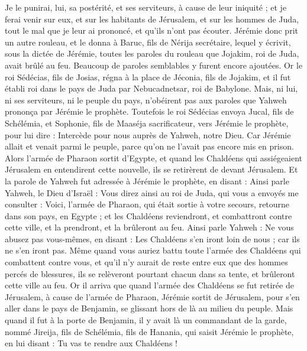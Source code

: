 \begin{multicols}{2}
Je le punirai, lui, sa postérité, et ses serviteurs, à cause de leur iniquité ; et je ferai venir sur eux, et sur les habitants de Jérusalem, et sur les hommes de Juda, tout le mal que je leur ai prononcé, et qu'ils n'ont pas écouter.
Jérémie donc prit un autre rouleau, et le donna à Baruc, fils de Nérija secrétaire, lequel y écrivit, sous la dictée de Jérémie, toutes les paroles du rouleau que Jojakim, roi de Juda, avait brûlé au feu. Beaucoup de paroles semblables y furent encore ajoutées.
\VerseOne{}Or le roi Sédécias, fils de Josias, régna à la place de Jéconia, fils de Jojakim, et il fut établi roi dans le pays de Juda par Nebucadnetsar, roi de Babylone.
Mais, ni lui, ni ses serviteurs, ni le peuple du pays, n'obéirent pas aux paroles que Yahweh prononça par Jérémie le prophète.
Toutefois le roi Sédécias envoya Jucal, fils de Schélémia, et Sophonie, fils de Maaséja sacrificateur, vers Jérémie le prophète, pour lui dire : Intercède pour nous auprès de Yahweh, notre Dieu.
Car Jérémie allait et venait parmi le peuple, parce qu'on ne l'avait pas encore mis en prison.
Alors l'armée de Pharaon sortit d'Egypte, et quand les Chaldéens qui assiégeaient Jérusalem en entendirent cette nouvelle, ils se retirèrent de devant Jérusalem.
Et la parole de Yahweh fut adressée à Jérémie le prophète, en disant :
Ainsi parle Yahweh, le Dieu d'Israël : Vous direz ainsi au roi de Juda, qui vous a envoyés me consulter : Voici, l'armée de Pharaon, qui était sortie à votre secours, retourne dans son pays, en Egypte ;
et les Chaldéens reviendront, et combattront contre cette ville, et la prendront, et la brûleront au feu.
Ainsi parle Yahweh : Ne vous abusez pas vous-mêmes, en disant : Les Chaldéens s'en iront loin de nous ; car ils ne s'en iront pas.
Même quand vous auriez battu toute l'armée des Chaldéens qui combattent contre vous, et qu'il n'y aurait de reste entre eux que des hommes percés de blessures, ils se relèveront pourtant chacun dans sa tente, et brûleront cette ville au feu.
Or il arriva que quand l'armée des Chaldéens se fut retirée de Jérusalem, à cause de l'armée de Pharaon,
Jérémie sortit de Jérusalem, pour s'en aller dans le pays de Benjamin, se glissant hors de là au milieu du peuple.
Mais quand il fut à la porte de Benjamin, il y avait là un commandant de la garde, nommé Jireija, fils de Schélémia, fils de Hanania, qui saisit Jérémie le prophète, en lui disant : Tu vas te rendre aux Chaldéens !

\end{multicols}
